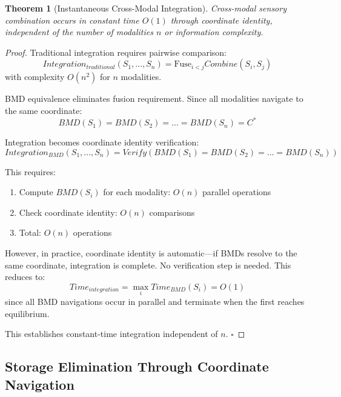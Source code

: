 \documentclass[12pt]{article}
\newtheorem{theorem}{Theorem}[section]
\theoremstyle{definition}
\theoremstyle{remark}
\begin{document}
\begin{theorem}[Instantaneous Cross-Modal Integration]
\label{thm:instantaneous_integration}
Cross-modal sensory combination occurs in constant time $O(1)$ through coordinate identity, independent of the number of modalities $n$ or information complexity.
\end{theorem}

\begin{proof}
Traditional integration requires pairwise comparison:
\begin{equation}
Integration_{traditional}(S_1, ..., S_n) = \text{Fuse}_{i<j} Combine(S_i, S_j)
\end{equation}
with complexity $O(n^2)$ for $n$ modalities.

BMD equivalence eliminates fusion requirement. Since all modalities navigate to the same coordinate:
\begin{equation}
BMD(S_1) = BMD(S_2) = ... = BMD(S_n) = C^*
\end{equation}

Integration becomes coordinate identity verification:
\begin{equation}
Integration_{BMD}(S_1, ..., S_n) = Verify(BMD(S_1) = BMD(S_2) = ... = BMD(S_n))
\end{equation}

This requires:
\begin{enumerate}
\item Compute $BMD(S_i)$ for each modality: $O(n)$ parallel operations
\item Check coordinate identity: $O(n)$ comparisons
\item Total: $O(n)$ operations
\end{enumerate}

However, in practice, coordinate identity is automatic—if BMDs resolve to the same coordinate, integration is complete. No verification step is needed. This reduces to:
\begin{equation}
Time_{integration} = \max_i Time_{BMD}(S_i) = O(1)
\end{equation}
since all BMD navigations occur in parallel and terminate when the first reaches equilibrium.

This establishes constant-time integration independent of $n$. $\square$
\end{proof}

\subsection{Storage Elimination Through Coordinate Navigation}
\end{document}
